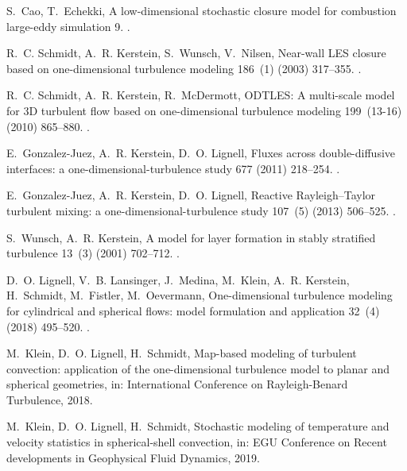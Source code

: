 \documentclass[preprint,12pt, a4paper]{elsarticle}
\begin{document}
\begin{thebibliography}{10}
S.~Cao, T.~Echekki, A low-dimensional stochastic closure model for combustion
  large-eddy simulation 9.
\newblock \href {http://dx.doi.org/10.1080/14685240701790714}
  {}.

R.~C. Schmidt, A.~R. Kerstein, S.~Wunsch, V.~Nilsen, Near-wall {LES} closure
  based on one-dimensional turbulence modeling 186~(1) (2003) 317--355.
\newblock \href {http://dx.doi.org/10.1016/S0021-9991(03)00071-8}
  {}.

R.~C. Schmidt, A.~R. Kerstein, R.~McDermott, {ODTLES}: A multi-scale model for
  3{D} turbulent flow based on one-dimensional turbulence modeling 199~(13-16)
  (2010) 865--880.
\newblock \href {http://dx.doi.org/10.1016/j.cma.2008.05.028}
  {}.

E.~Gonzalez-Juez, A.~R. Kerstein, D.~O. Lignell, Fluxes across double-diffusive
  interfaces: a one-dimensional-turbulence study 677 (2011) 218--254.
\newblock \href {http://dx.doi.org/10.1017/jfm.2011.78}
  {}.

E.~Gonzalez-Juez, A.~R. Kerstein, D.~O. Lignell, Reactive {R}ayleigh--{T}aylor
  turbulent mixing: a one-dimensional-turbulence study 107~(5) (2013) 506--525.
\newblock \href {http://dx.doi.org/10.1080/03091929.2012.736504}
  {}.

S.~Wunsch, A.~R. Kerstein, A model for layer formation in stably stratified
  turbulence 13~(3) (2001) 702--712.
\newblock \href {http://dx.doi.org/10.1063/1.1344182}
  {}.

D.~O. Lignell, V.~B. Lansinger, J.~Medina, M.~Klein, A.~R. Kerstein,
  H.~Schmidt, M.~Fistler, M.~Oevermann, One-dimensional turbulence modeling for
  cylindrical and spherical flows: model formulation and application 32~(4)
  (2018) 495--520.
\newblock \href {http://dx.doi.org/10.1007/s00162-018-0465-1}
  {}.

M.~Klein, D.~O. Lignell, H.~Schmidt, Map-based modeling of turbulent
  convection: application of the one-dimensional turbulence model to planar and
  spherical geometries, in: International Conference on Rayleigh-Benard
  Turbulence, 2018.

M.~Klein, D.~O. Lignell, H.~Schmidt, Stochastic modeling of temperature and
  velocity statistics in spherical-shell convection, in: EGU Conference on
  Recent developments in Geophysical Fluid Dynamics, 2019.


\end{thebibliography}
\end{document}
